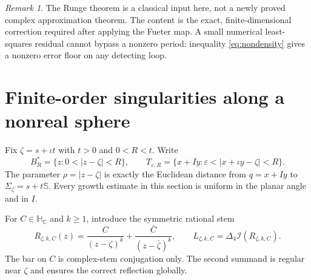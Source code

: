 \documentclass[11pt,a4paper]{article}
\numberwithin{equation}{section}
\theoremstyle{definition}
\theoremstyle{remark}
\newtheorem{remark}[theorem]{Remark}
\newcommand{\C}{\mathbb C}
\newcommand{\HC}{\mathbb H_{\C}}
\newcommand{\SSS}{\mathbb S}
\newcommand{\lap}{\Delta_4}
\newcommand{\cI}{\mathcal I}
\begin{document}
\begin{remark}
The Runge theorem is a classical input here, not a newly proved complex
approximation theorem. The content is the exact, finite-dimensional
correction required after applying the Fueter map. A small numerical
least-squares residual cannot bypass a nonzero period: inequality
\eqref{eq:nondensity} gives a nonzero error floor on any detecting loop.
\end{remark}

\section{Finite-order singularities along a nonreal sphere}
\label{sec:singular}
Fix $\zeta=s+\iota t$ with $t>0$ and $0<R<t$. Write
\[
 B_R^*=\{z:0<|z-\zeta|<R\},\qquad
 T_{\varepsilon,R}=\{x+Iy:\varepsilon<|x+\iota y-\zeta|<R\}.
\]
The parameter $\rho=|z-\zeta|$ is exactly the Euclidean distance from
$q=x+Iy$ to $\Sigma_\zeta=s+t\SSS$. Every growth estimate in this
section is uniform in the planar angle and in $I$.

For $C\in\HC$ and $k\geq1$, introduce the symmetric rational stem
\begin{equation}
 R_{\zeta,k,C}(z)=\frac{C}{(z-\zeta)^k}
                 +\frac{\bar C}{(z-\bar\zeta)^k},
 \qquad
 L_{\zeta,k,C}=\lap\cI(R_{\zeta,k,C}).
 \label{eq:rationalprincipal}
\end{equation}
The bar on $C$ is complex-stem conjugation only. The second summand is
regular near $\zeta$ and ensures the correct reflection globally.
\end{document}
